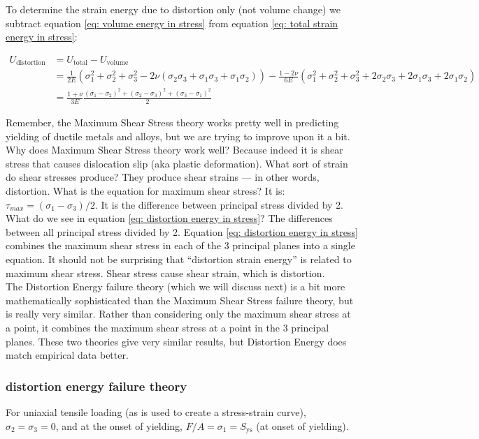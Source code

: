 To determine the strain energy due to distortion only (not volume change) we subtract equation \ref{eq: volume energy in stress} from equation \ref{eq: total strain energy in stress}:

\begin{equation}\label{eq: distortion energy in stress}
\begin{split}
U_\mathrm{distortion} &= U_\mathrm{total} - U_\mathrm{volume} \\
&= \frac{1}{2E} \left(\sigma_1^2+\sigma_2^2 + \sigma_3^2 - 2\nu\left(\sigma_2\sigma_3 + \sigma_1\sigma_3 +\sigma_1\sigma_2 \right)\right) - \frac{1-2\nu}{6E} \left(\sigma_1^2+\sigma_2^2 + \sigma_3^2 + 2\sigma_2\sigma_3 + 2\sigma_1\sigma_3 +2\sigma_1\sigma_2 \right) \\
&=\frac{1+\nu}{3E}\frac{(\sigma_1-\sigma_2)^2+(\sigma_2-\sigma_3)^2+(\sigma_3-\sigma_1)^2}{2}
\end{split}
\end{equation}

Remember, the Maximum Shear Stress theory works pretty well in predicting
yielding of ductile metals and alloys, but we are trying to improve upon it a bit. Why does Maximum Shear Stress theory work well? Because indeed it is shear stress that causes dislocation slip (aka plastic deformation). What sort of strain do shear stresses produce? They produce shear strains --- in other words, distortion. What is the equation for maximum shear stress? It is: $ \tau_{max} = (\sigma_1 - \sigma_3) / 2 $. It is the difference between principal stress divided by 2. What do we see in equation \ref{eq: distortion energy in stress}? The differences between all principal stress divided by 2. Equation \ref{eq: distortion energy in stress} combines the maximum shear stress in each of the 3 principal planes into a single equation. It should not be surprising that “distortion strain energy” is related to maximum shear stress. Shear stress cause shear strain, which is distortion. \\

The Distortion Energy failure theory (which we will discuss next) is a bit more mathematically sophisticated than the Maximum Shear Stress failure theory, but is really very similar. Rather than considering only the maximum shear stress at a point, it combines the maximum shear stress at a point in the 3 principal planes. These two theories give very similar results, but Distortion Energy does match empirical data better. 

\subsubsection{distortion energy failure theory}
For uniaxial tensile loading (as is used to create a stress-strain curve), $ \sigma_2 = \sigma_3 = 0 $, and at the onset of yielding, $ F/A = \sigma_1 = S_\mathrm{ys} $ (at onset of yielding).

